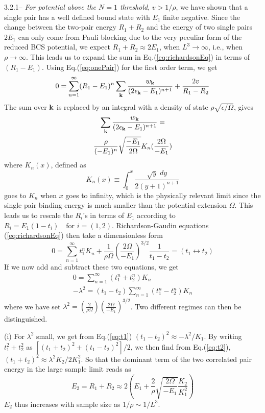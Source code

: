 \documentclass[5p,twocolumn]{elsarticle}
\begin{document}
3.2.1-- {\it For potential above the $N=1$ threshold}, $v>1/\rho$, we have shown that a single pair has a well defined bound state with $E_1$  finite negative. Since the change between the two-pair energy $R_{1}+R_{2}$ and the energy of two single pairs  $2E_{1}$ can only come from Pauli blocking due to the very peculiar form of the reduced BCS potential, we expect $R_1+R_2\approx2E_1$, when $L^3\rightarrow\infty$, i.e., when $\rho\rightarrow\infty$. This leads us to expand the sum in Eq.(\ref{eq:richardsonEq}) in terms of $(R_{1}-E_{1})$.  Using Eq.(\ref{eq:onePair}) for the first order term, we get
\begin{equation}
0=\sum_{n=1}^{\infty}(R_{1}-E_{1})^{n}\sum_{\mathbf{k}}\frac{w_{\mathbf{k}}}{(2\epsilon_{\mathbf{k}}-E_1)^{n+1}}+\frac{2v}{R_1-R_2}
\end{equation}
The sum over $\mathbf{k}$ is replaced by an integral with a density of state $\rho\sqrt{\epsilon/\Omega}$, gives
\begin{multline}
\sum_{\mathbf{k}}\frac{w_{\mathbf{k}}}{(2\epsilon_{\mathbf{k}}-E_1)^{n+1}}=\\\frac{\rho}{(-E_{1})^{n}}\sqrt{\frac{-E_{1}}{2\Omega}}K_{n}(\frac{2\Omega}{-E_{1}})
\end{multline}
where $K_{n}(x)$, defined as
\begin{equation}
K_{n}(x)\equiv\int_{0}^{x}\frac{\sqrt{y}\;dy}{2(y+1)^{n+1}}
\end{equation}
goes to $K_{n}$ when $x$ goes to infinity, which is the physically relevant limit since the single pair binding energy is much smaller than the potential extension $\Omega$.
This leads us to rescale the $R_{i}$'s in terms of $E_{1}$ according to
$R_{i}=E_{1}(1-t_{i})\quad\text{for }i=(1,2)$. Richardson-Gaudin equations (\ref{eq:richardsonEq}) then take a dimensionless form
\begin{equation}
0=\sum_{n=1}^{\infty}t_{1}^{n}K_{n}+\frac{1}{\rho\Omega}\left(\frac{2\Omega}{-E_{1}}\right)^{3/2}\frac{1}{t_1-t_2}=(t_{1}\leftrightarrow{}t_{2})
\end{equation}
If we now add and subtract these two equations, we get
\begin{gather}
0=\sum_{n=1}^{\infty}(t_{1}^{n}+t_{2}^{n})K_{n}\label{eq:t2}\\
-\lambda^{2}=(t_{1}-t_{2})\sum_{n=1}^{\infty}(t_{1}^{n}-t_{2}^{n})K_{n}\label{eq:t1}
\end{gather}
where we have set $\lambda^2=(\frac{2}{\rho\Omega})(\frac{2\Omega}{-E_{1}})^{3/2}$.
Two different regimes can then be distinguished.  

(i) For $\lambda^{2}$ small, we get from Eq.(\ref{eq:t1}) $(t_{1}-t_{2})^{2}\approx-\lambda^{2}/K_{1}$. By writing $t_{1}^{2}+t_{2}^{2}$ as $\left[(t_{1}+t_{2})^{2}+(t_{1}-t_{2})^{2}\right]/2$, we then find from Eq.(\ref{eq:t2}), $(t_{1}+t_{2})^{2}\approx\lambda^{2}K_{2}/2K_{1}^{2}$.  So that the dominant term of the two correlated pair energy in the large sample limit reads as 
\begin{equation}
E_{2}=R_{1}+R_{2}\approx2\left(E_{1}+\frac{2}{\rho}\sqrt{\frac{2\Omega}{-E_{1}}}\frac{K_{2}}{K_{1}^{2}}\right)
\end{equation}
$E_{2}$ thus increases with sample size as $1/\rho\sim1/L^{3}$.
\end{document}
